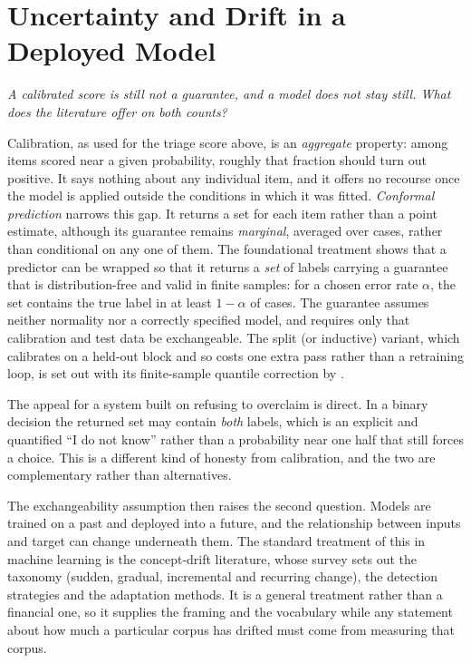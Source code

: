 \section{Uncertainty and Drift in a Deployed Model}
\label{sec:sota_uncertainty}

\emph{A calibrated score is still not a guarantee, and a model does not stay still. What does the
literature offer on both counts?}

Calibration, as used for the triage score above, is an \emph{aggregate} property: among items scored
near a given probability, roughly that fraction should turn out positive. It says nothing about any
individual item, and it offers no recourse once the model is applied outside the conditions in which
it was fitted. \emph{Conformal prediction} narrows this gap. It returns a set for each item rather
than a point estimate, although its guarantee remains \emph{marginal}, averaged over cases, rather
than conditional on any one of them. The foundational treatment
\autocite{vovk2005algorithmic} shows that a predictor can be wrapped so that it returns a
\emph{set} of labels carrying a guarantee that is distribution-free and valid in finite samples: for
a chosen error rate $\alpha$, the set contains the true label in at least $1-\alpha$ of cases. The
guarantee assumes neither normality nor a correctly specified model, and requires only that
calibration and test data be exchangeable. The split (or inductive) variant, which calibrates on a
held-out block and so costs one extra pass rather than a retraining loop,
is set out with its finite-sample quantile correction by \textcite{angelopoulos2023conformal}.

The appeal for a system built on refusing to overclaim is direct. In a binary decision the returned
set may contain \emph{both} labels, which is an explicit and quantified ``I do not know'' rather than
a probability near one half that still forces a choice. This is a different kind of honesty from
calibration, and the two are complementary rather than alternatives.

The exchangeability assumption then raises the second question. Models are trained on a past and
deployed into a future, and the relationship between inputs and target can change underneath them.
The standard treatment of this in machine learning is the concept-drift literature, whose survey
\autocite{gama2014survey} sets out the taxonomy (sudden, gradual, incremental and recurring change),
the detection strategies and the adaptation methods. It is a general treatment rather than a
financial one, so it supplies the framing and the vocabulary while any statement about how much a
particular corpus has drifted must come from measuring that corpus.

